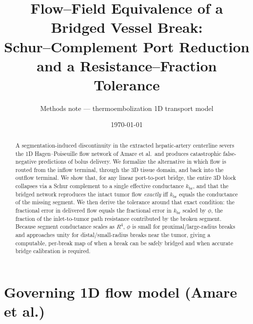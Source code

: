 \documentclass[11pt]{article}
\title{\vspace{-2em}Flow--Field Equivalence of a Bridged Vessel Break:\\
Schur--Complement Port Reduction and a Resistance--Fraction Tolerance}
\author{Methods note --- thermoembolization 1D transport model}
\date{\today}
\newcommand{\kbr}{k_{\mathrm{br}}}
\begin{document}
\maketitle
\vspace{-1.5em}

\begin{abstract}
\noindent
A segmentation-induced discontinuity in the extracted hepatic-artery centerline
severs the 1D Hagen--Poiseuille flow network of Amare et al.\ and produces
catastrophic false-negative predictions of bolus delivery. We formalize the
alternative in which flow is routed from the inflow terminal, through the 3D
tissue domain, and back into the outflow terminal. We show that, for any linear
port-to-port bridge, the entire 3D block collapses via a Schur complement to a
single effective conductance $\kbr$, and that the bridged network reproduces the
intact tumor flow \emph{exactly} iff $\kbr$ equals the conductance of the missing
segment. We then derive the tolerance around that exact condition: the fractional
error in delivered flow equals the fractional error in $\kbr$ scaled by
$\phi$, the fraction of the inlet-to-tumor path resistance contributed by the
broken segment. Because segment conductance scales as $R^4$, $\phi$ is small for
proximal/large-radius breaks and approaches unity for distal/small-radius breaks
near the tumor, giving a computable, per-break map of when a break can be safely
bridged and when accurate bridge calibration is required.
\end{abstract}

\section{Governing 1D flow model (Amare et al.)}
\label{sec:model}
\end{document}
